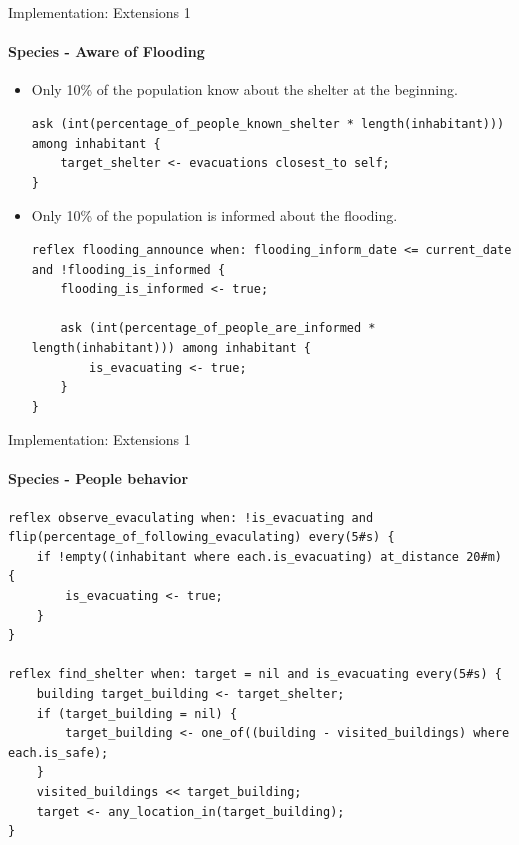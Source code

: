 \documentclass{beamer}
\begin{document}
\begin{frame}[fragile]{Implementation: Extensions 1}
\framesubtitle{Species - Aware of Flooding}

\begin{itemize}
    \item Only 10\% of the population know about the shelter at the beginning.
    
\begin{lstlisting}[style=GAML]
ask (int(percentage_of_people_known_shelter * length(inhabitant))) among inhabitant {
    target_shelter <- evacuations closest_to self;
}
\end{lstlisting}

    \item Only 10\% of the population is informed about the flooding.
\begin{lstlisting}[style=GAML]
reflex flooding_announce when: flooding_inform_date <= current_date and !flooding_is_informed {		
    flooding_is_informed <- true;
    
    ask (int(percentage_of_people_are_informed * length(inhabitant))) among inhabitant {
        is_evacuating <- true;
    }
} 
\end{lstlisting}

\end{itemize}

\end{frame}


\begin{frame}[fragile]{Implementation: Extensions 1}
\framesubtitle{Species - People behavior}

\begin{lstlisting}[style=GAML]
reflex observe_evaculating when: !is_evacuating and flip(percentage_of_following_evaculating) every(5#s) {
    if !empty((inhabitant where each.is_evacuating) at_distance 20#m)  {
        is_evacuating <- true;
    }
}

reflex find_shelter when: target = nil and is_evacuating every(5#s) {
    building target_building <- target_shelter;
    if (target_building = nil) {
        target_building <- one_of((building - visited_buildings) where each.is_safe);
    }
    visited_buildings << target_building;
    target <- any_location_in(target_building);
}
\end{lstlisting}


\end{frame}
\end{document}

